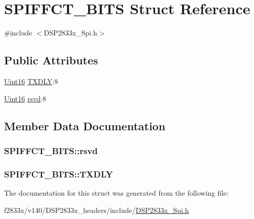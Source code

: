 \hypertarget{struct_s_p_i_f_f_c_t___b_i_t_s}{}\section{S\+P\+I\+F\+F\+C\+T\+\_\+\+B\+I\+T\+S Struct Reference}
\label{struct_s_p_i_f_f_c_t___b_i_t_s}


{\ttfamily \#include $<$D\+S\+P2833x\+\_\+\+Spi.\+h$>$}

\subsection*{Public Attributes}
\begin{DoxyCompactItemize}
\item 
\hyperlink{_d_s_p2833x___device_8h_a59a9f6be4562c327cbfb4f7e8e18f08b}{Uint16} \hyperlink{struct_s_p_i_f_f_c_t___b_i_t_s_a4c9a9a955bb716ba1ec0bbf15f087324}{T\+X\+D\+L\+Y}\+:8
\item 
\hyperlink{_d_s_p2833x___device_8h_a59a9f6be4562c327cbfb4f7e8e18f08b}{Uint16} \hyperlink{struct_s_p_i_f_f_c_t___b_i_t_s_aa7e31582c750a9b61de015b89b1f449e}{rsvd}\+:8
\end{DoxyCompactItemize}


\subsection{Member Data Documentation}
\hypertarget{struct_s_p_i_f_f_c_t___b_i_t_s_aa7e31582c750a9b61de015b89b1f449e}{}
\subsubsection[{rsvd}]{ S\+P\+I\+F\+F\+C\+T\+\_\+\+B\+I\+T\+S\+::rsvd}\label{struct_s_p_i_f_f_c_t___b_i_t_s_aa7e31582c750a9b61de015b89b1f449e}
\hypertarget{struct_s_p_i_f_f_c_t___b_i_t_s_a4c9a9a955bb716ba1ec0bbf15f087324}{}
\subsubsection[{T\+X\+D\+L\+Y}]{ S\+P\+I\+F\+F\+C\+T\+\_\+\+B\+I\+T\+S\+::\+T\+X\+D\+L\+Y}\label{struct_s_p_i_f_f_c_t___b_i_t_s_a4c9a9a955bb716ba1ec0bbf15f087324}


The documentation for this struct was generated from the following file\+:\begin{DoxyCompactItemize}
\item 
f2833x/v140/\+D\+S\+P2833x\+\_\+headers/include/\hyperlink{_d_s_p2833x___spi_8h}{D\+S\+P2833x\+\_\+\+Spi.\+h}\end{DoxyCompactItemize}
